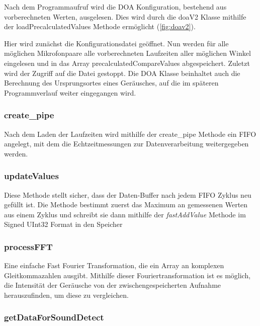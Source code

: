 Nach dem Programmaufruf wird die DOA Konfiguration, bestehend aus vorberechneten Werten, ausgelesen. Dies wird durch die doaV2 Klasse mithilfe der loadPrecalculatedValues Methode ermöglicht (\autoref{fig:doav2}).

Hier wird zunächst die Konfigurationsdatei geöffnet. Nun werden für alle möglichen Mikrofonpaare alle vorberechneten Laufzeiten aller möglichen Winkel eingelesen und in das Array precalculatedCompareValues abgespeichert. Zuletzt wird der Zugriff auf die Datei gestoppt. Die DOA Klasse beinhaltet auch die Berechnung des Ursprungsortes eines Geräusches, auf die im späteren Programmverlauf weiter eingegangen wird.



\subsubsection{create\_pipe}

Nach dem Laden der Laufzeiten wird mithilfe der create\_pipe Methode ein FIFO angelegt, mit dem die Echtzeitmessungen zur Datenverarbeitung weitergegeben werden.

\subsubsection{updateValues}

Diese Methode stellt sicher, dass der Daten-Buffer nach jedem FIFO Zyklus neu gefüllt ist. Die Methode bestimmt zuerst das Maximum an gemessenen Werten aus einem Zyklus und schreibt sie dann mithilfe der \textit{fastAddValue} Methode im Signed UInt32 Format in den Speicher

\subsubsection{processFFT}

Eine einfache \glqq Fast Fourier Transformation\grqq, die ein Array an komplexen Gleitkommazahlen ausgibt. Mithilfe dieser Fouriertransformation ist es möglich, die Intensität der Geräusche von der zwischengespeicherten Aufnahme herauszufinden, um diese zu vergleichen.


\subsubsection{getDataForSoundDetect}

